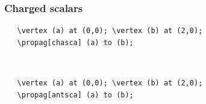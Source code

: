 \documentclass[10pt,letterpaper,twoside,notitlepage]{article}
\numberwithin{figure}{section}
\begin{document}
\subsubsection*{Charged scalars}
%
\begin{minipage}{0.7\linewidth}
\vercol\begin{verbatim}
   \vertex (a) at (0,0); \vertex (b) at (2,0);
   \propag[chasca] (a) to (b);
\end{verbatim}\txcol
\end{minipage}
%
\begin{minipage}{0.25\linewidth}
\end{minipage}
\\
%
\begin{minipage}{0.7\linewidth}
\vercol\begin{verbatim}
   \vertex (a) at (0,0); \vertex (b) at (2,0);
   \propag[antsca] (a) to (b);
\end{verbatim}\txcol
\end{minipage}
%
\begin{minipage}{0.25\linewidth}
\end{minipage}
\\
%
\end{document}
